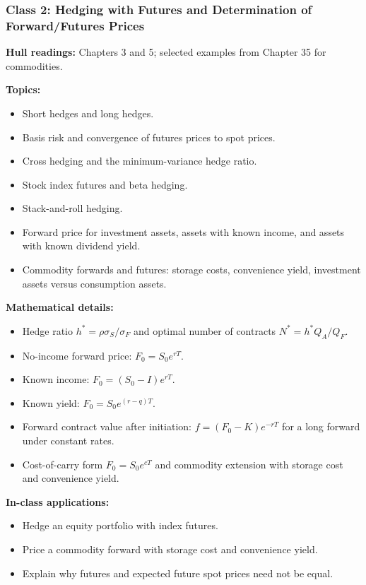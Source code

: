 \documentclass[11pt]{article}
\begin{document}
\subsubsection*{Class 2: Hedging with Futures and Determination of Forward/Futures Prices}
\textbf{Hull readings:} Chapters 3 and 5; selected examples from Chapter 35 for commodities.

\textbf{Topics:}
\begin{itemize}
    \item Short hedges and long hedges.
    \item Basis risk and convergence of futures prices to spot prices.
    \item Cross hedging and the minimum-variance hedge ratio.
    \item Stock index futures and beta hedging.
    \item Stack-and-roll hedging.
    \item Forward price for investment assets, assets with known income, and assets with known dividend yield.
    \item Commodity forwards and futures: storage costs, convenience yield, investment assets versus consumption assets.
\end{itemize}

\textbf{Mathematical details:}
\begin{itemize}
    \item Hedge ratio $h^*=\rho \sigma_S/\sigma_F$ and optimal number of contracts $N^*=h^*Q_A/Q_F$.
    \item No-income forward price: $F_0=S_0 e^{rT}$.
    \item Known income: $F_0=(S_0-I)e^{rT}$.
    \item Known yield: $F_0=S_0 e^{(r-q)T}$.
    \item Forward contract value after initiation: $f=(F_0-K)e^{-rT}$ for a long forward under constant rates.
    \item Cost-of-carry form $F_0=S_0e^{cT}$ and commodity extension with storage cost and convenience yield.
\end{itemize}

\textbf{In-class applications:}
\begin{itemize}
    \item Hedge an equity portfolio with index futures.
    \item Price a commodity forward with storage cost and convenience yield.
    \item Explain why futures and expected future spot prices need not be equal.
\end{itemize}
\end{document}
